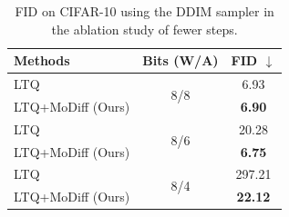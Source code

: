 \begin{table}[h!]
\centering
\caption{FID on CIFAR-10 using the DDIM sampler in the ablation study of fewer steps.}
\begin{tabular}{l|c|c}
\toprule
{Methods} & {Bits (W/A)} & FID $\downarrow$\\
\midrule
LTQ & \multirow{2}{*}{8/8} & 6.93 \\
LTQ+MoDiff (Ours) & & \bf 6.90 \\
\midrule
LTQ & \multirow{2}{*}{8/6} & 20.28 \\
LTQ+MoDiff (Ours) & & \bf 6.75 \\
\midrule
LTQ & \multirow{2}{*}{8/4} & 297.21 \\
LTQ+MoDiff (Ours) & & \bf 22.12 \\
\bottomrule
\end{tabular}
\label{tab:fewstep}
\end{table}
